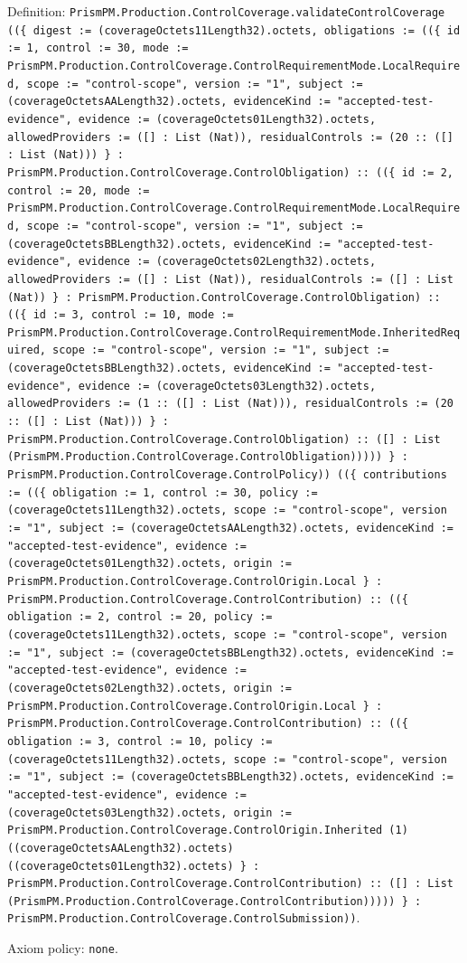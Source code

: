 \documentclass[11pt]{article}
\begin{document}
\noindent Definition: \texttt{PrismPM.Production.ControlCoverage.validateControlCoverage ((\{ digest := (coverageOctets11Length32).octets, obligations := ((\{ id := 1, control := 30, mode := PrismPM.Production.ControlCoverage.ControlRequirementMode.LocalRequired, scope := "control-scope", version := "1", subject := (coverageOctetsAALength32).octets, evidenceKind := "accepted-test-evidence", evidence := (coverageOctets01Length32).octets, allowedProviders := ([] : List (Nat)), residualControls := (20 :: ([] : List (Nat))) \} : PrismPM.Production.ControlCoverage.ControlObligation) :: ((\{ id := 2, control := 20, mode := PrismPM.Production.ControlCoverage.ControlRequirementMode.LocalRequired, scope := "control-scope", version := "1", subject := (coverageOctetsBBLength32).octets, evidenceKind := "accepted-test-evidence", evidence := (coverageOctets02Length32).octets, allowedProviders := ([] : List (Nat)), residualControls := ([] : List (Nat)) \} : PrismPM.Production.ControlCoverage.ControlObligation) :: ((\{ id := 3, control := 10, mode := PrismPM.Production.ControlCoverage.ControlRequirementMode.InheritedRequired, scope := "control-scope", version := "1", subject := (coverageOctetsBBLength32).octets, evidenceKind := "accepted-test-evidence", evidence := (coverageOctets03Length32).octets, allowedProviders := (1 :: ([] : List (Nat))), residualControls := (20 :: ([] : List (Nat))) \} : PrismPM.Production.ControlCoverage.ControlObligation) :: ([] : List (PrismPM.Production.ControlCoverage.ControlObligation))))) \} : PrismPM.Production.ControlCoverage.ControlPolicy)) ((\{ contributions := ((\{ obligation := 1, control := 30, policy := (coverageOctets11Length32).octets, scope := "control-scope", version := "1", subject := (coverageOctetsAALength32).octets, evidenceKind := "accepted-test-evidence", evidence := (coverageOctets01Length32).octets, origin := PrismPM.Production.ControlCoverage.ControlOrigin.Local \} : PrismPM.Production.ControlCoverage.ControlContribution) :: ((\{ obligation := 2, control := 20, policy := (coverageOctets11Length32).octets, scope := "control-scope", version := "1", subject := (coverageOctetsBBLength32).octets, evidenceKind := "accepted-test-evidence", evidence := (coverageOctets02Length32).octets, origin := PrismPM.Production.ControlCoverage.ControlOrigin.Local \} : PrismPM.Production.ControlCoverage.ControlContribution) :: ((\{ obligation := 3, control := 10, policy := (coverageOctets11Length32).octets, scope := "control-scope", version := "1", subject := (coverageOctetsBBLength32).octets, evidenceKind := "accepted-test-evidence", evidence := (coverageOctets03Length32).octets, origin := PrismPM.Production.ControlCoverage.ControlOrigin.Inherited (1) ((coverageOctetsAALength32).octets) ((coverageOctets01Length32).octets) \} : PrismPM.Production.ControlCoverage.ControlContribution) :: ([] : List (PrismPM.Production.ControlCoverage.ControlContribution))))) \} : PrismPM.Production.ControlCoverage.ControlSubmission))}.\par
\noindent Axiom policy: \texttt{none}.\par
\end{document}
